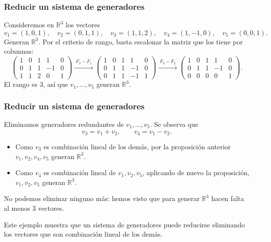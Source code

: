 \begin{frame}
    \frametitle{Reducir un sistema de generadores}

    \begin{example}
        Consideremos en \(\mathbb{R}^3\) los vectores
        \[
            v_1=(1,0,1),\quad
            v_2=(0,1,1),\quad
            v_3=(1,1,2),\quad
            v_4=(1,-1,0),\quad
            v_5=(0,0,1).
        \]
        \alert{Generan \(\mathbb{R}^3\).} Por el criterio de rango, basta
        escalonar la matriz que los tiene por columnas:
        \[
            \begin{pmatrix}
                1&0&1&1&0\\
                0&1&1&-1&0\\
                1&1&2&0&1
            \end{pmatrix}
            \xrightarrow{\;F_3-F_1\;}
            \begin{pmatrix}
                1&0&1&1&0\\
                0&1&1&-1&0\\
                0&1&1&-1&1
            \end{pmatrix}
            \xrightarrow{\;F_3-F_2\;}
            \begin{pmatrix}
                1&0&1&1&0\\
                0&1&1&-1&0\\
                0&0&0&0&1
            \end{pmatrix}.
        \]
        El rango es \(3\), así que \(v_1,\ldots,v_5\) generan \(\mathbb{R}^3\).
    \end{example}
\end{frame}


\begin{frame}
    \frametitle{Reducir un sistema de generadores}

    \begin{example}
        \alert{Eliminamos generadores redundantes} de
        \(v_1,\ldots,v_5\). Se observa que
        \[
            v_3=v_1+v_2,
            \qquad
            v_4=v_1-v_2.
        \]
        \begin{itemize}
            \item Como \(v_3\) es combinación lineal de los demás, por la
                  proposición anterior \(v_1,v_2,v_4,v_5\) generan \(\mathbb{R}^3\).
            \item Como \(v_4\) es combinación lineal de \(v_1,v_2,v_5\),
                  aplicando de nuevo la proposición, \(v_1,v_2,v_5\)
                  generan \(\mathbb{R}^3\).
        \end{itemize}

        No podemos eliminar ninguno más: hemos visto que para generar
        \(\mathbb{R}^3\) hacen falta al menos \(3\) vectores.
    \end{example}

    \medskip

    Este ejemplo muestra que un sistema de generadores puede reducirse
    eliminando los vectores que son combinación lineal de los demás.
\end{frame}


